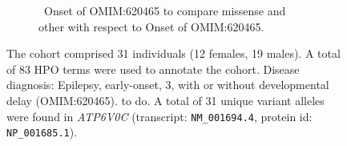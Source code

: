 \begin{figure}[htbp]
\vspace{2em}

\begin{subfigure}[b]{0.95\textwidth}
\captionsetup{justification=raggedright,singlelinecheck=false}
\caption{ Onset of OMIM:620465 to compare missense and other with respect to Onset of OMIM:620465. }
\end{subfigure}

\vspace{2em}

\caption{ The cohort comprised 31 individuals (12 females, 19 males). A total of 83 HPO terms were used to annotate the cohort. Disease diagnosis: Epilepsy, early-onset, 3, with or without developmental delay (OMIM:620465). to do. A total of 31 unique variant alleles were found in \textit{ATP6V0C} (transcript: \texttt{NM\_001694.4}, protein id: \texttt{NP\_001685.1}).}
\end{figure}
